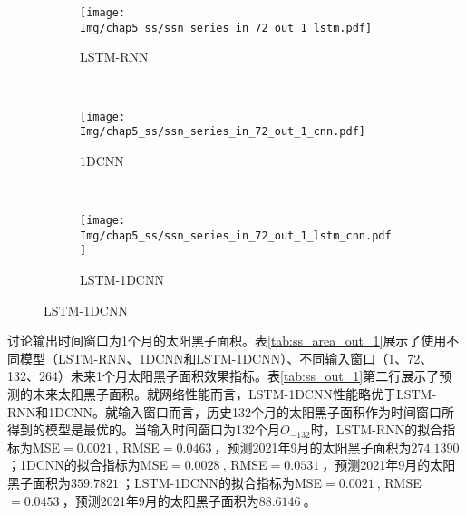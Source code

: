 \begin{figure}[!htbp]
  \centering
  \begin{subfigure}[b]{1.0\textwidth}
    \caption{LSTM-RNN} 
    \vspace{-0.35cm}
    \texttt{[image: Img/chap5\_ss/ssn\_series\_in\_72\_out\_1\_lstm.pdf]}
    \label{fig:ssn_series_in_72_out_1_lstm}
  \end{subfigure}    \\
  \vspace{-1cm}
  \begin{subfigure}[b]{1.0\textwidth}
    \caption{1DCNN}
    \vspace{-0.35cm}
    \texttt{[image: Img/chap5\_ss/ssn\_series\_in\_72\_out\_1\_cnn.pdf]}
    \label{fig:ssn_series_in_72_out_1_cnn}
  \end{subfigure} \\
  \vspace{-1cm}
  \begin{subfigure}[b]{1.0\textwidth}
    \caption{LSTM-1DCNN}
    \vspace{-0.35cm}
    \texttt{[image: Img/chap5\_ss/ssn\_series\_in\_72\_out\_1\_lstm\_cnn.pdf]}
    \label{fig:ssn_series_in_72_out_1_lstm_cnn}
    \end{subfigure}
  \vspace{-2cm}
  \label{fig:ssn_series_in_72_out_1}
\end{figure}

讨论输出时间窗口为1个月的太阳黑子面积。表\ref{tab:ss_area_out_1}展示了使用不同模型（LSTM-RNN、1DCNN和LSTM-1DCNN）、不同输入窗口（1、72、132、264）未来1个月太阳黑子面积效果指标。表\ref{tab:ss_out_1}第二行展示了预测的未来太阳黑子面积。就网络性能而言，LSTM-1DCNN性能略优于LSTM-RNN和1DCNN。就输入窗口而言，历史132个月的太阳黑子面积作为时间窗口所得到的模型是最优的。当输入时间窗口为132个月$O_{-132}$时，LSTM-RNN的拟合指标为MSE$=\SI{0.0021}{}$, RMSE$=\SI{0.0463}{}$，预测2021年9月的太阳黑子面积为$\SI{274.1390}{}$；1DCNN的拟合指标为MSE$=\SI{0.0028}{}$, RMSE$=\SI{0.0531}{}$，预测2021年9月的太阳黑子面积为$\SI{359.7821}{}$；LSTM-1DCNN的拟合指标为MSE$=\SI{0.0021}{}$, RMSE$=\SI{0.0453}{}$，预测2021年9月的太阳黑子面积为$\SI{88.6146}{}$。

